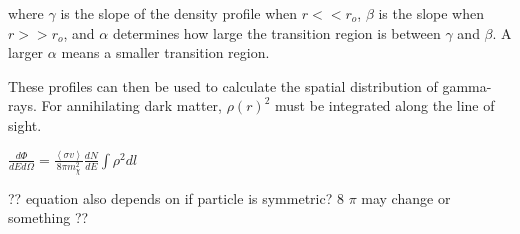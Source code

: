 where $\gamma$ is the slope of the density profile when $r << r_o$, $\beta$ is the slope when $r >> r_o$, and $\alpha$ determines how large the transition region is between $\gamma$ and $\beta$.
A larger $\alpha$ means a smaller transition region.

These profiles can then be used to calculate the spatial distribution of gamma-rays.
For annihilating dark matter, $\rho\left(r\right)^2$ must be integrated along the line of sight.

$ \frac{d\Phi}{dE d\Omega}= \frac{ \left \langle \sigma v \right \rangle }{8 \pi m_\chi^2} \frac{dN}{dE} \int \rho^2 dl $ \label{eqn:dmflux}

?? equation also depends on if particle is symmetric? 8 $\pi$ may change or something ??



